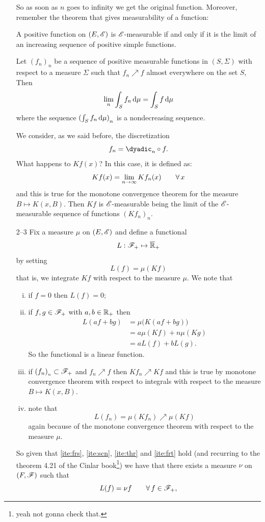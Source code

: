 \documentclass{report}
\begin{document}
\begin{fancyproof}
\begin{enumerate}
\begin{lemma}
		\end{lemma}
		So as soon as $n$ goes to infinity we get the original function. Moreover, remember the theorem that gives measurability of a function:
		\begin{revise}
			\begin{theorem}
				A positive function on $(E,\E)$ is $\E$-measurable if and only if it is the limit of an increasing sequence of positive simple functions.
			\end{theorem}
			\begin{theorem}
				Let ${(f_n)}_{n}$ be a sequence of positive measurable functions in $(S,\Sigma)$ with respect to a measure $\Sigma$ such that $f_n\nearrow f$ almost everywhere on the set $S$, Then 
				\[\lim_{n}\int_S f_n\dmu=\int_{S}^{}f\dmu\]
				where the sequence ${(\int_S f_n \dmu)}_{n}$ is a nondecreasing sequence.
			\end{theorem}
		\end{revise}
		We consider, as we said before, the discretization
		\[f_n=\dyadic_n\circ f.\]
		What happens to $K f(x)$? In this case, it is defined as:
		\[Kf(x)=\lim_{n\to\infty}K f_n(x)\qquad\every x\]
		and this is true for the monotone convergence theorem for the measure $B\mapsto K(x,B)$. Then $Kf$ is $\E$-measurable being the limit of the $\E$-measurable sequence of functions $(Kf_n)_n$.
		\item[2--3] Fix a measure $\mu$ on $(E,\E)$ and define a functional 
		\[L:\mathscr{F}_+\mapsto\overline{\mathbb{R}}_+\]
		by setting 
		\[L(f)=\mu(Kf)\]
		that is, we integrate $Kf$ with respect to the measure $\mu$. We note that
		\begin{enumerate}[i.)]
			\item\label{ite:frs} if $f=0$ then $L(f)=0$;
			\item\label{ite:scn} if $f,g\in\mathscr{F}_+$ with $a,b\in\mathbb{R}_+$ then 
			\begin{align*}
				L(af+bg)&=\mu\big(K(af+bg)\big)\\
				&=a\mu(Kf)+n\mu(Kg)\\
				&=aL(f)+bL(g).
			\end{align*}
			So the functional is a linear function.
			\item\label{ite:thr} if $(f_n)_{_{n}}\subset\mathscr{F}_+$ and $f_{n}\nearrow f$ then  $Kf_n\nearrow Kf$ and this is true by monotone convergence theorem with respect to integrals with respect to the measure $B\mapsto K(x, B)$. 
			\item\label{ite:frt} note that 
			\[L(f_n)=\mu(Kf_n)\nearrow\mu(Kf)\]
			again because of the monotone convergence theorem with respect to the measure $\mu$.
		\end{enumerate}
		So given that \ref{ite:frs}, \ref{ite:scn}, \ref{ite:thr} and \ref{ite:frt} hold (and recurring to the theorem 4.21 of the Cinlar book\footnote{yeah not gonna check that.}) we have that there exists a measure $\nu$ on $(F,\mathscr{F})$ such that
		\[L(f)=\nu f\qquad \forall\, f\in\mathscr{F}_+,\]
	

\end{enumerate}
\end{fancyproof}
\end{document}
